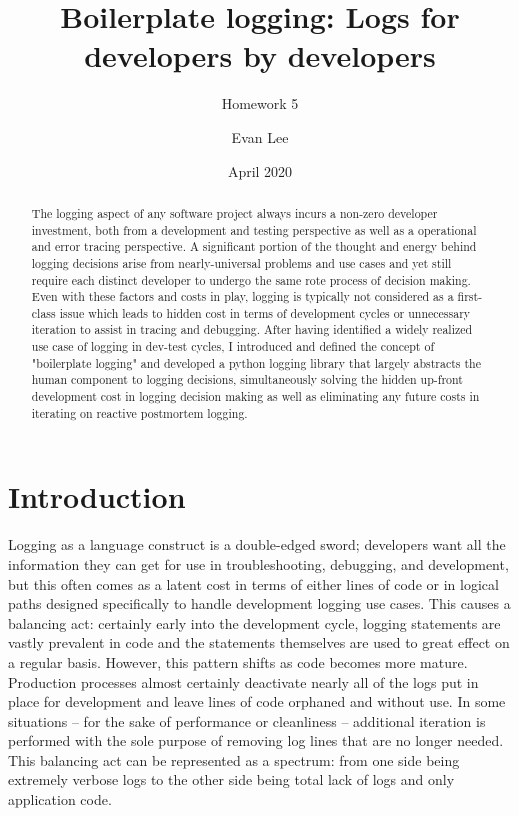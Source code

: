 \documentclass[acmsmall,review,authorversion]{acmart}
\title{Boilerplate logging: Logs for developers by developers}
\subtitle{Homework 5}
\author{Evan Lee}
\affiliation{%
    \institution{University of Colorado Boulder}
    \city{Boulder}
    \state{Colorado}
}
\date{April 2020}
\begin{document}
\begin{abstract}
    The logging aspect of any software project always incurs a non-zero developer investment, both from a development and testing perspective as well as a operational and error tracing perspective. A significant portion of the thought and energy behind logging decisions arise from nearly-universal problems and use cases and yet still require each distinct developer to undergo the same rote process of decision making. Even with these factors and costs in play, logging is typically not considered as a first-class issue which leads to hidden cost in terms of development cycles or unnecessary iteration to assist in tracing and debugging. After having identified a widely realized use case of logging in dev-test cycles, I introduced and defined the concept of "boilerplate logging" and developed a python logging library that largely abstracts the human component to logging decisions, simultaneously solving the hidden up-front development cost in logging decision making as well as eliminating any future costs in iterating on reactive postmortem logging.
\end{abstract}

\maketitle

\section{Introduction}

    Logging as a language construct is a double-edged sword; developers want all the information they can get for use in troubleshooting, debugging, and development, but this often comes as a latent cost in terms of either lines of code or in logical paths designed specifically to handle development logging use cases. This causes a balancing act: certainly early into the development cycle, logging statements are vastly prevalent in code and the statements themselves are used to great effect on a regular basis. However, this pattern shifts as code becomes more mature. Production processes almost certainly deactivate nearly all of the logs put in place for development and leave lines of code orphaned and without use. In some situations -- for the sake of performance or cleanliness -- additional iteration is performed with the sole purpose of removing log lines that are no longer needed. This balancing act can be represented as a spectrum: from one side being extremely verbose logs to the other side being total lack of logs and only application code.
    
\end{document}
